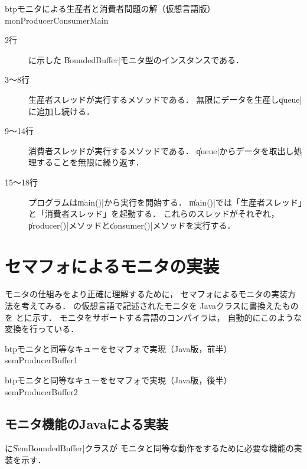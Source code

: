 \begin{myfig}{btp}{モニタによる生産者と消費者問題の解（仮想言語版）}
{monProducerConsumerMain}

\end{myfig}

\begin{description}
\item [2行] 
に示した
\|BoundedBuffer|モニタ型のインスタンスである．

\item [3〜8行]
生産者スレッドが実行するメソッドである．
無限にデータを生産し\|queue|に追加し続ける．

\item [9〜14行]
消費者スレッドが実行するメソッドである．
\|queue|からデータを取出し処理することを無限に繰り返す．

\item [15〜18行]
プログラムは\|main()|から実行を開始する．
\|main()|では「生産者スレッド」と「消費者スレッド」を起動する．
これらのスレッドがそれぞれ，
\|producer()|メソッドと\|consumer()|メソッドを実行する．

\end{description}

\section{セマフォによるモニタの実装}
モニタの仕組みをより正確に理解するために，
セマフォによるモニタの実装方法を考えてみる．
の仮想言語で記述されたモニタを
Javaクラスに書換えたものを
とに示す．
モニタをサポートする言語のコンパイラは，
自動的にこのような変換を行っている．

\begin{myfig}{btp}{モニタと同等なキューをセマフォで実現（Java版，前半）}
{semProducerBuffer1}

\end{myfig}

\begin{myfig}{btp}{モニタと同等なキューをセマフォで実現（Java版，後半）}
{semProducerBuffer2}

\end{myfig}

\subsection{モニタ機能のJavaによる実装}
に\|SemBoundedBuffer|クラスが
モニタと同等な動作をするために必要な機能の実装を示す．

